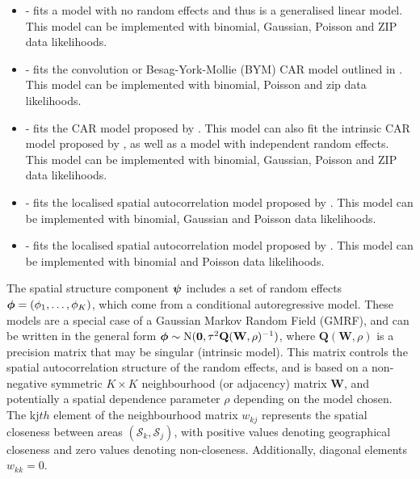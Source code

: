 \documentclass[article,shortnames,nojss]{jss}
\newcommand{\bd}[1]{\ensuremath{\mbox{\boldmath $#1$}}}
\begin{document}
\begin{itemize}
\item {} - fits a model with no random effects and thus is a generalised linear model. This model can be implemented with binomial, Gaussian, Poisson and ZIP data likelihoods.

\item {} - fits the convolution or Besag-York-Mollie (BYM) CAR model outlined in \cite{besag1991}. This model can be implemented with binomial, Poisson and zip data likelihoods.

\item {} - fits the CAR model proposed by \cite{leroux2000}. This model can also fit the intrinsic CAR model proposed by \cite{besag1991}, as well as a model with independent random effects. This model can be implemented with binomial, Gaussian, Poisson and ZIP data likelihoods.

\item {} - fits the localised spatial autocorrelation model proposed by \cite{lee2012}. This model can be implemented with binomial, Gaussian and Poisson data likelihoods.

\item {} - fits the localised spatial autocorrelation model proposed by \cite{lee2015}. This model can be implemented with binomial and Poisson data likelihoods.
\end{itemize}


The spatial structure component $\bd{\psi}$ includes a set of random effects $\bd{\phi}=(\phi_{1},\ldots,\phi_{K})$, which come from a conditional autoregressive model. These models are a special case of a Gaussian Markov Random Field (GMRF), and can be written in the general form $\bd{\phi}\sim\mbox{N}(\mathbf{0},\tau^{2}\mathbf{Q}(\mathbf{W},\rho)^{-1})$, where $\mathbf{Q}(\mathbf{W},\rho)$ is a precision matrix that may be singular (intrinsic model). This matrix controls the spatial autocorrelation structure of the random effects, and is based on a non-negative symmetric $K\times K$ neighbourhood (or adjacency) matrix $\mathbf{W}$, and potentially a spatial dependence parameter $\rho$ depending on the model chosen. The kj$th$ element of the neighbourhood matrix $w_{kj}$ represents the spatial closeness between areas $(\mathcal{S}_k, \mathcal{S}_j)$, with positive values denoting geographical closeness and zero values denoting non-closeness. Additionally, diagonal elements $w_{kk}=0$.
\end{document}

